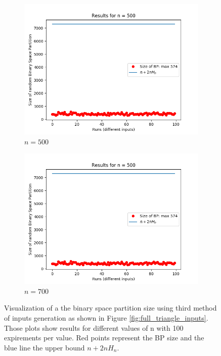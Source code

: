 \documentclass[letterpaper]{article}
\begin{document}
\begin{figure}[H]
\begin{subfigure}{.33\textwidth}
      \includegraphics[width=1\linewidth]{images/assign1/fulltriangle/inputs_500}
      \caption{$n = 500$}
    \end{subfigure}
    \begin{subfigure}{.33\textwidth}
      \centering
      \includegraphics[width=1\linewidth]{images/assign1/fulltriangle/inputs_500}
      \caption{$n = 700$}
    \end{subfigure}
    \caption{Visualization of a the binary space partition size using
    third method of inputs generation as shown in Figure \ref{fig:full_triangle_inputs}.
    Those plots show results for
    different values of n with 100 expirements per value. Red points represent
    the BP size and the blue line the upper bound $n + 2nH_n$.}
    \label{fig:expirements_fulltriangle}
\end{figure}
\end{document}
